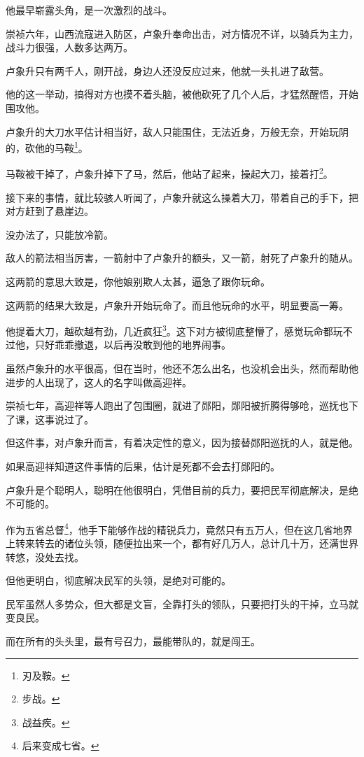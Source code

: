 \begin{multicols}{\theparacolNo}
		他最早崭露头角，是一次激烈的战斗。

		崇祯六年，山西流寇进入防区，卢象升奉命出击，对方情况不详，以骑兵为主力，战斗力很强，人数多达两万。

		卢象升只有两千人，刚开战，身边人还没反应过来，他就一头扎进了敌营。

		他的这一举动，搞得对方也摸不着头脑，被他砍死了几个人后，才猛然醒悟，开始围攻他。

		卢象升的大刀水平估计相当好，敌人只能围住，无法近身，万般无奈，开始玩阴的，砍他的马鞍\footnote{刃及鞍。}。

		马鞍被干掉了，卢象升掉下了马，然后，他站了起来，操起大刀，接着打\footnote{步战。}。

		接下来的事情，就比较骇人听闻了，卢象升就这么操着大刀，带着自己的手下，把对方赶到了悬崖边。

		没办法了，只能放冷箭。

		敌人的箭法相当厉害，一箭射中了卢象升的额头，又一箭，射死了卢象升的随从。

		这两箭的意思大致是，你他娘别欺人太甚，逼急了跟你玩命。

		这两箭的结果大致是，卢象升开始玩命了。而且他玩命的水平，明显要高一筹。

		他提着大刀，越砍越有劲，几近疯狂\footnote{战益疾。}。这下对方被彻底整懵了，感觉玩命都玩不过他，只好乖乖撤退，以后再没敢到他的地界闹事。

		虽然卢象升的水平很高，但在当时，他还不怎么出名，也没机会出头，然而帮助他进步的人出现了，这人的名字叫做高迎祥。

		崇祯七年，高迎祥等人跑出了包围圈，就进了郧阳，郧阳被折腾得够呛，巡抚也下了课，这事说过了。

		但这件事，对卢象升而言，有着决定性的意义，因为接替郧阳巡抚的人，就是他。

		如果高迎祥知道这件事情的后果，估计是死都不会去打郧阳的。

		卢象升是个聪明人，聪明在他很明白，凭借目前的兵力，要把民军彻底解决，是绝不可能的。

		作为五省总督\footnote{后来变成七省。}，他手下能够作战的精锐兵力，竟然只有五万人，但在这几省地界上转来转去的诸位头领，随便拉出来一个，都有好几万人，总计几十万，还满世界转悠，没处去找。

		但他更明白，彻底解决民军的头领，是绝对可能的。

		民军虽然人多势众，但大都是文盲，全靠打头的领队，只要把打头的干掉，立马就变良民。

		而在所有的头头里，最有号召力，最能带队的，就是闯王。


\end{multicols}
